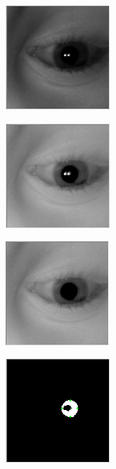 \documentclass[rapport.tex]{subfiles}
\begin{document}
	\begin{figure}
	\centering
	\includegraphics[width=0.4\linewidth]{Billeder/Cropped Eye.png}
	\caption{}
	\label{fig:CroppedEye}
	\end{figure}
	
	\begin{figure}
	\centering
	\includegraphics[width=0.4\linewidth]{Billeder/Cropped Eye, Post Brightness.png}
	\caption{}
	\label{fig:CroppedEye,PostBrightness}
	\end{figure}
	
	\begin{figure}
	\centering
	\includegraphics[width=0.4\linewidth]{Billeder/Cropped Eye, Reflection removed.png}
	\caption{}
	\label{fig:CroppedEye,Reflectionremoved}
	\end{figure}
	
		
	\begin{figure}
	\centering
	\includegraphics[width=0.4\linewidth]{Billeder/PupilThresholding}
	\caption{}
	\label{fig:PupilThresholding}
	\end{figure}
		
\end{document}

